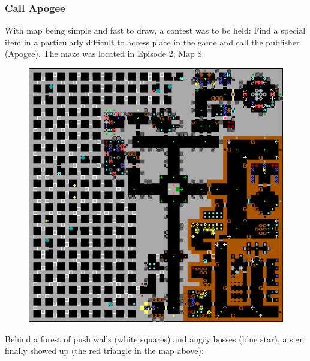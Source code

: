 \subsubsection{Call Apogee}
With map being simple and fast to draw, a contest was to be held: Find a special item in a particularly difficult to access place in the game and call the publisher (Apogee). The maze was located in Episode 2, Map 8:\\
\par
\begin{figure}[H]
  \centering
 \includegraphics[width=\textwidth]{imgs/e2m8.png}
\end{figure}

\par
Behind a forest of push walls (white squares) and angry bosses (blue star), a sign finally showed up (the red triangle in the map above):\\
\par

